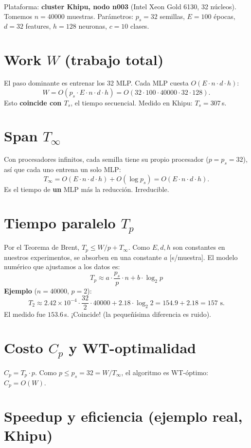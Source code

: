 \documentclass[11pt,a4paper]{article}
\begin{document}
Plataforma: \textbf{cluster Khipu, nodo n003} (Intel Xeon Gold 6130, 32 núcleos).
Tomemos $n=40000$ muestras. Parámetros: $p_s=32$ semillas, $E=100$ épocas,
$d=32$ features, $h=128$ neuronas, $c=10$ clases.

\section{Work $W$ (trabajo total)}

El paso dominante es entrenar los 32 MLP. Cada MLP cuesta $O(E\cdot n\cdot
d\cdot h)$:
\[
W = O(p_s \cdot E \cdot n \cdot d \cdot h) = O(32\cdot 100\cdot 40000\cdot 32\cdot 128).
\]
Esto \textbf{coincide con $T_s$}, el tiempo secuencial. Medido en Khipu:
$T_s=307$\,s.

\section{Span $T_\infty$}

Con procesadores infinitos, cada semilla tiene su propio procesador ($p=p_s=32$),
así que cada uno entrena un solo MLP:
\[
T_\infty = O(E\cdot n\cdot d\cdot h) + O(\log p_s) = O(E\cdot n\cdot d\cdot h).
\]
Es el tiempo de \textbf{un} MLP más la reducción. Irreducible.

\section{Tiempo paralelo $T_p$}

Por el Teorema de Brent, $T_p \le W/p + T_\infty$. Como $E,d,h$ son constantes
en nuestros experimentos, se absorben en una constante $a$ [s/muestra]. El modelo
numérico que ajustamos a los datos es:
\[
\boxed{T_p \approx a\cdot\frac{p_s}{p}\cdot n + b\cdot\log_2 p}
\]
\textbf{Ejemplo} ($n=40000$, $p=2$):
\[
T_2 \approx 2.42\!\times\!10^{-4}\cdot\frac{32}{2}\cdot 40000 + 2.18\cdot\log_2 2
= 154.9 + 2.18 = 157\text{ s}.
\]
El medido fue $153.6$\,s. ¡Coincide! (la pequeñísima diferencia es ruido).

\section{Costo $C_p$ y WT-optimalidad}

$C_p = T_p\cdot p$. Como $p\le p_s=32=W/T_\infty$, el algoritmo es WT-óptimo:
$C_p=O(W)$.

\section{Speedup y eficiencia (ejemplo real, Khipu)}
\end{document}
